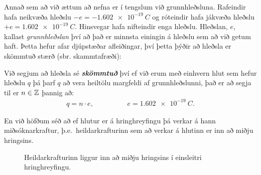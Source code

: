 Annað sem að við ættum að nefna er í tengslum við grunnhleðsluna. Rafeindir hafa neikvæða hleðslu $-e = \SI{-1.602e-19}{C}$ og róteindir hafa jákvæða hleðslu $+e = \SI{+1.602e-19}{C}$. Hinsvegar hafa nifteindir enga hleðslu. Hleðslan, $e$, kallast \emph{grunnhleðslan} því að það er minnsta einingin á hleðslu sem að við getum haft. Þetta hefur afar djúpstæðar afleiðingar, því þetta þýðir að hleðsla er skömmtuð stærð (sbr. skammtafræði):

\begin{tcolorbox}
\begin{definition}
Við segjum að hleðsla sé \emph{\textbf{skömmtuð}} því ef við erum með einhvern hlut sem hefur hleðslu $q$ þá þarf $q$ að vera heiltölu margfeldi af grunnhleðslunni, það er að segja til er $n \in \mathbb{Z}$ þannig að:
\begin{align*}
    q = n \cdot e, \hspace{2cm} e = \SI{1.602e-19}{C}.
\end{align*}
\end{definition}

\end{tcolorbox}

En við höfðum séð að ef hlutur er á hringhreyfingu þá verkar á hann miðsóknarkraftur, þ.e.~heildarkrafturinn sem að verkar á hlutinn er inn að miðju hringsins.

\begin{figure}[H]
    \centering
    \caption{Heildarkrafturinn liggur inn að miðju hringsins í einsleitri hringhreyfingu.}
\end{figure}

